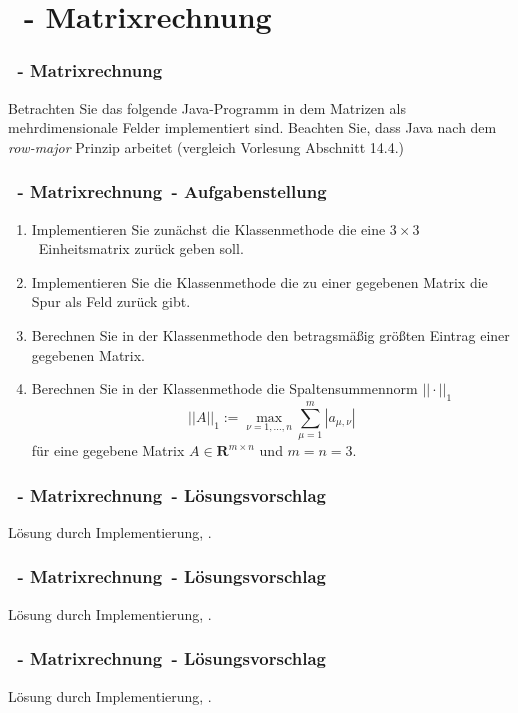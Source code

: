 \def\stitle{\theexercise\ - Matrixrechnung}
\section{\stitle}
\begin{frame}%
  \frametitle{\stitle}%

Betrachten Sie das folgende Java-Programm in dem Matrizen als mehrdimensionale Felder implementiert sind.
Beachten Sie, dass Java nach dem \emph{row-major} Prinzip arbeitet (vergleich Vorlesung Abschnitt 14.4.)
\medskip


\end{frame}


\begin{frame}%
  \frametitle{\stitle\ - Aufgabenstellung}%
\medskip

\begin{enumerate}
\item Implementieren Sie zun\"achst die Klassenmethode  die eine $3\times 3$~Einheitsmatrix zur\"uck geben soll.
\item Implementieren Sie die Klassenmethode  die zu einer gegebenen Matrix die Spur als Feld zur\"uck gibt.
\item Berechnen Sie in der Klassenmethode  den betragsm\"a\ss ig gr\"o\ss ten Eintrag einer gegebenen Matrix.
\item Berechnen Sie in der Klassenmethode  die Spaltensummennorm $||\cdot||_1$  $$||A||_1 := \max_{\nu=1,\ldots,n} \sum_{\mu=1}^m |a_{\mu,\nu}| $$ f\"ur eine gegebene Matrix $A\in\mathbf{R}^{m\times n}$ und $m=n=3$.
\end{enumerate}

\end{frame}


\begin{frame}%
  \frametitle{\stitle\ - L\"osungsvorschlag}%
\medskip

L\"osung durch Implementierung, .

\end{frame}


\begin{frame}%
  \frametitle{\stitle\ - L\"osungsvorschlag}%
\medskip

L\"osung durch Implementierung, .

\end{frame}


\begin{frame}%
  \frametitle{\stitle\ - L\"osungsvorschlag}%
\medskip

L\"osung durch Implementierung, .

\end{frame}
